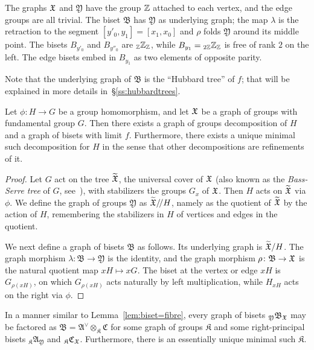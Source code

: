 \documentclass{amsart}
\begin{document}
\begin{exple}
  The graphs ${\mathfrak X}$ and $\mathfrak Y$ have the group ${\mathbb Z}$
  attached to each vertex, and the edge groups are all trivial. The
  biset $\mathfrak B$ has $\mathfrak Y$ as underlying graph; the map
  $\lambda$ is the retraction to the segment $[y'_0,y_1]=[x_1,x_0]$
  and $\rho$ folds $\mathfrak Y$ around its middle point. The bisets
  $B_{y'_0}$ and $B_{y''_0}$ are ${}_{\mathbb Z}{\mathbb Z}_{\mathbb Z}$, while
  $B_{y_1}={}_{2{\mathbb Z}}{\mathbb Z}_{\mathbb Z}$ is free of rank $2$ on the left. The edge
  bisets embed in $B_{y_1}$ as two elements of opposite parity.

  Note that the underlying graph of $\mathfrak B$ is the ``Hubbard
  tree'' of $f$; that will be explained in more details
  in~\S\ref{ss:hubbardtrees}.
\end{exple}

\begin{prop}
  Let $\phi\colon H\to G$ be a group homomorphism, and let ${\mathfrak X}$ be a graph
  of groups with fundamental group $G$. Then there exists a graph of
  groups decomposition of $H$ and a graph of bisets with limit
  $f$. Furthermore, there exists a unique minimal such decomposition
  for $H$ in the sense that other decompositions are refinements of
  it.
\end{prop}
\begin{proof}
  Let $G$ act on the tree $\widetilde{{\mathfrak X}}$, the universal cover of
  ${\mathfrak X}$ (also known as the \emph{Bass-Serre tree} of $G$,
  see~\cite{serre:trees}), with stabilizers the groups $G_x$ of
  ${\mathfrak X}$. Then $H$ acts on $\widetilde{{\mathfrak X}}$ via $\phi$. We define the
  graph of groups $\mathfrak Y$ as $\widetilde{{\mathfrak X}}/\!/H$, namely as the
  quotient of $\widetilde{{\mathfrak X}}$ by the action of $H$, remembering the
  stabilizers in $H$ of vertices and edges in the quotient.

  We next define a graph of bisets $\mathfrak B$ as follows. Its
  underlying graph is $\widetilde{{\mathfrak X}}/H$. The graph morphism
  $\lambda\colon\mathfrak B\to\mathfrak Y$ is the identity, and the graph
  morphism $\rho\colon\mathfrak B\to{\mathfrak X}$ is the natural quotient map
  $x H\mapsto x G$. The biset at the vertex or edge $x H$ is
  $G_{\rho(x H)}$, on which $G_{\rho(x H)}$ acts naturally by left
  multiplication, while $H_{x H}$ acts on the right via $\phi$.
\end{proof}

\begin{rem}
  In a manner similar to Lemma~\ref{lem:biset=fibre}, every graph of
  bisets ${}_{\mathfrak Y}\mathfrak B_{\mathfrak X}$ may be factored as
  $\mathfrak B=\mathfrak A^\vee\otimes_{\mathfrak K}\mathfrak C$ for
  some graph of groups $\mathfrak K$ and some right-principal bisets
  ${}_{\mathfrak K}\mathfrak A_{\mathfrak Y}$ and ${}_{\mathfrak
    K}\mathfrak C_{\mathfrak X}$. Furthermore, there is an essentially unique
  minimal such $\mathfrak K$.
\end{rem}
\end{document}
